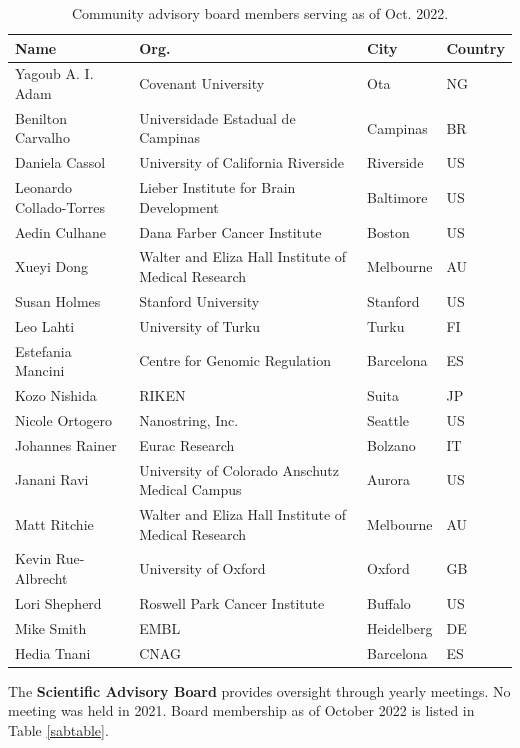 \documentclass[letterpaper]{article}
\begin{document}
\begin{table}[ht]
\centering
\label{cabtable}
\caption{Community advisory board members serving as of Oct. 2022.}
\begin{tabular}{llll}
  \hline
  Name & Org. & City & Country \\ 
  \hline
 Yagoub A. I. Adam & Covenant University & Ota & NG \\ 
   Benilton Carvalho & Universidade Estadual de Campinas & Campinas & BR \\ 
   Daniela Cassol & University of California Riverside & Riverside & US \\ 
   Leonardo Collado-Torres & Lieber Institute for Brain Development & Baltimore & US \\ 
   Aedin Culhane & Dana Farber Cancer Institute & Boston & US \\ 
   Xueyi Dong & Walter and Eliza Hall Institute of Medical Research & Melbourne & AU \\ 
   Susan Holmes & Stanford University & Stanford & US \\ 
   Leo Lahti & University of Turku & Turku & FI \\ 
   Estefania Mancini & Centre for Genomic Regulation & Barcelona & ES \\ 
   Kozo Nishida & RIKEN & Suita & JP \\ 
   Nicole Ortogero & Nanostring, Inc. & Seattle & US \\ 
   Johannes Rainer & Eurac Research & Bolzano & IT \\ 
   Janani Ravi & University of Colorado Anschutz Medical Campus & Aurora & US \\ 
   Matt Ritchie & Walter and Eliza Hall Institute of Medical Research & Melbourne & AU \\ 
   Kevin Rue-Albrecht & University of Oxford & Oxford & GB \\ 
   Lori Shepherd & Roswell Park Cancer Institute & Buffalo & US \\ 
   Mike Smith & EMBL & Heidelberg & DE \\ 
   Hedia Tnani & CNAG & Barcelona & ES \\ 
   \hline
\end{tabular}
\end{table}


The \textbf{Scientific Advisory Board} provides oversight through
yearly meetings.  No meeting was held in 2021.  Board
membership as of October 2022 is listed in Table \ref{sabtable}.
\end{document}
